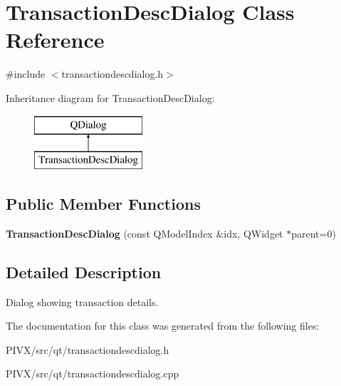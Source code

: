 \hypertarget{class_transaction_desc_dialog}{}\section{Transaction\+Desc\+Dialog Class Reference}
\label{class_transaction_desc_dialog}


{\ttfamily \#include $<$transactiondescdialog.\+h$>$}

Inheritance diagram for Transaction\+Desc\+Dialog\+:\begin{figure}[H]
\begin{center}
\leavevmode
\includegraphics[height=2.000000cm]{class_transaction_desc_dialog}
\end{center}
\end{figure}
\subsection*{Public Member Functions}
\begin{DoxyCompactItemize}
\item 
\mbox{\label{class_transaction_desc_dialog_aa4431a7da806415ed068437cabd6e9bc}} 
{\bfseries Transaction\+Desc\+Dialog} (const Q\+Model\+Index \&idx, Q\+Widget $\ast$parent=0)
\end{DoxyCompactItemize}


\subsection{Detailed Description}
Dialog showing transaction details. 

The documentation for this class was generated from the following files\+:\begin{DoxyCompactItemize}
\item 
P\+I\+V\+X/src/qt/transactiondescdialog.\+h\item 
P\+I\+V\+X/src/qt/transactiondescdialog.\+cpp\end{DoxyCompactItemize}
